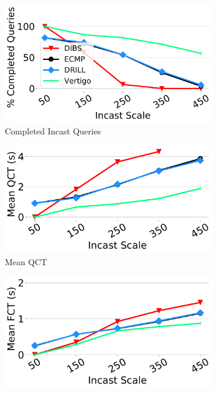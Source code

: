 \begin{figure}[t]
	\begin{subfigure}[t]{.45\linewidth}
	\centering
	\includegraphics[width=0.98\linewidth]{figs/scale50qc.pdf}
		\caption{\small{Completed Incast Queries}}
		\label{fig:scale_qc}
	\end{subfigure}
	\begin{subfigure}[t]{.45\linewidth}
	\centering
	\includegraphics[width=0.98\linewidth]{figs/scale50qct.pdf}
		\caption{\small{Mean QCT}}
		\label{fig:scale_qct}
	\end{subfigure}
	\begin{subfigure}[t]{.45\linewidth}
	\centering
	\includegraphics[width=0.98\linewidth]{figs/scale50fctall.pdf}

\end{subfigure}
\end{figure}

